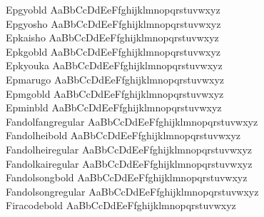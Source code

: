 \begin{tabbing}
Epgyobld \> { AaBbCcDdEeFfghijklmnopqrstuvwxyz} \\
Epgyosho \> { AaBbCcDdEeFfghijklmnopqrstuvwxyz} \\
Epkaisho \> { AaBbCcDdEeFfghijklmnopqrstuvwxyz} \\
Epkgobld \> { AaBbCcDdEeFfghijklmnopqrstuvwxyz} \\
Epkyouka \> { AaBbCcDdEeFfghijklmnopqrstuvwxyz} \\
Epmarugo \> { AaBbCcDdEeFfghijklmnopqrstuvwxyz} \\
Epmgobld \> { AaBbCcDdEeFfghijklmnopqrstuvwxyz} \\
Epminbld \> { AaBbCcDdEeFfghijklmnopqrstuvwxyz} \\
Fandolfangregular \> { AaBbCcDdEeFfghijklmnopqrstuvwxyz} \\
Fandolheibold \> { AaBbCcDdEeFfghijklmnopqrstuvwxyz} \\
Fandolheiregular \> { AaBbCcDdEeFfghijklmnopqrstuvwxyz} \\
Fandolkairegular \> { AaBbCcDdEeFfghijklmnopqrstuvwxyz} \\
Fandolsongbold \> { AaBbCcDdEeFfghijklmnopqrstuvwxyz} \\
Fandolsongregular \> { AaBbCcDdEeFfghijklmnopqrstuvwxyz} \\
Firacodebold \> { AaBbCcDdEeFfghijklmnopqrstuvwxyz} \\

\end{tabbing}
